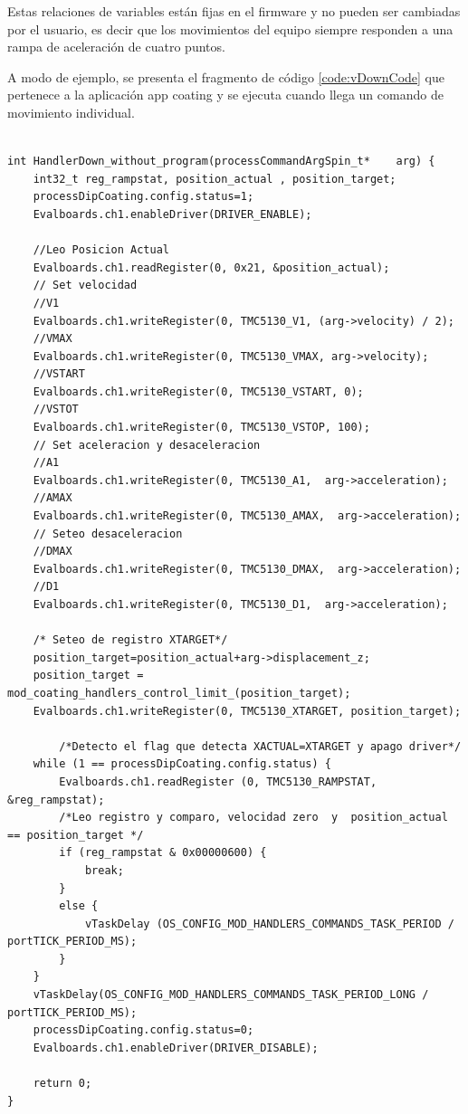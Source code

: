 Estas relaciones de variables están fijas en el firmware y no pueden ser cambiadas por el usuario, es decir que los movimientos del equipo siempre responden a una rampa de aceleración de cuatro puntos.


A modo de ejemplo, se presenta el fragmento de código \ref{code:vDownCode} que pertenece a la aplicación app coating y se ejecuta cuando llega un comando de movimiento individual.


\begin{lstlisting}[label=code:vDownCode,caption=Ejecución de comando DOWN.] % 

int HandlerDown_without_program(processCommandArgSpin_t*	arg) {
	int32_t reg_rampstat, position_actual , position_target;
	processDipCoating.config.status=1;
	Evalboards.ch1.enableDriver(DRIVER_ENABLE);

	//Leo Posicion Actual
	Evalboards.ch1.readRegister(0, 0x21, &position_actual);
	// Set velocidad
	//V1
	Evalboards.ch1.writeRegister(0, TMC5130_V1, (arg->velocity) / 2);
	//VMAX
	Evalboards.ch1.writeRegister(0, TMC5130_VMAX, arg->velocity);
	//VSTART
	Evalboards.ch1.writeRegister(0, TMC5130_VSTART, 0);
	//VSTOT
	Evalboards.ch1.writeRegister(0, TMC5130_VSTOP, 100);
	// Set aceleracion y desaceleracion
	//A1
	Evalboards.ch1.writeRegister(0, TMC5130_A1,  arg->acceleration);
	//AMAX
	Evalboards.ch1.writeRegister(0, TMC5130_AMAX,  arg->acceleration);
	// Seteo desaceleracion
	//DMAX
	Evalboards.ch1.writeRegister(0, TMC5130_DMAX,  arg->acceleration);
	//D1
	Evalboards.ch1.writeRegister(0, TMC5130_D1,  arg->acceleration);

	/* Seteo de registro XTARGET*/
	position_target=position_actual+arg->displacement_z;
	position_target = mod_coating_handlers_control_limit_(position_target);
	Evalboards.ch1.writeRegister(0, TMC5130_XTARGET, position_target);

		/*Detecto el flag que detecta XACTUAL=XTARGET y apago driver*/
	while (1 == processDipCoating.config.status) {
		Evalboards.ch1.readRegister (0, TMC5130_RAMPSTAT, &reg_rampstat);
		/*Leo registro y comparo, velocidad zero  y  position_actual == position_target */
		if (reg_rampstat & 0x00000600) {
			break;
		}
		else {
			vTaskDelay (OS_CONFIG_MOD_HANDLERS_COMMANDS_TASK_PERIOD / portTICK_PERIOD_MS);
		}
	}
	vTaskDelay(OS_CONFIG_MOD_HANDLERS_COMMANDS_TASK_PERIOD_LONG / portTICK_PERIOD_MS);
	processDipCoating.config.status=0;
	Evalboards.ch1.enableDriver(DRIVER_DISABLE);

	return 0;
}
\end{lstlisting}

